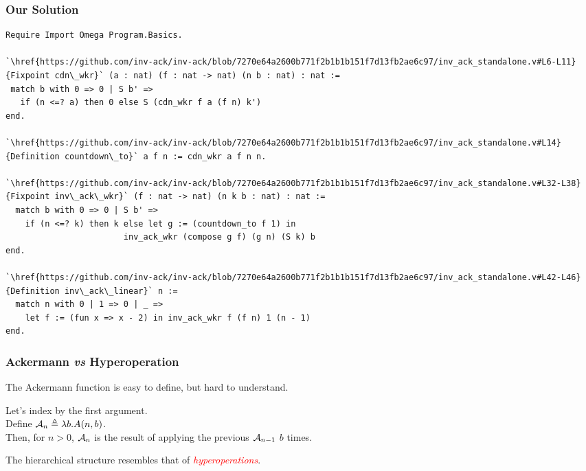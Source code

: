 \begin{frame}[fragile]
\frametitle{Our Solution}

\vspace{-1em}
\lstset{style=myTinyStyle}
\begin{mdframed}[backgroundcolor=lightgray, roundcorner=10pt,leftmargin=0, rightmargin=0, innerleftmargin=0, innertopmargin=-5,innerbottommargin=-5, outerlinewidth=0, linecolor=lightgray]
\begin{lstlisting}
Require Import Omega Program.Basics.

`\href{https://github.com/inv-ack/inv-ack/blob/7270e64a2600b771f2b1b1b151f7d13fb2ae6c97/inv_ack_standalone.v#L6-L11}{Fixpoint cdn\_wkr}` (a : nat) (f : nat -> nat) (n b : nat) : nat :=
 match b with 0 => 0 | S b' =>
   if (n <=? a) then 0 else S (cdn_wkr f a (f n) k')
end.

`\href{https://github.com/inv-ack/inv-ack/blob/7270e64a2600b771f2b1b1b151f7d13fb2ae6c97/inv_ack_standalone.v#L14}{Definition countdown\_to}` a f n := cdn_wkr a f n n.

`\href{https://github.com/inv-ack/inv-ack/blob/7270e64a2600b771f2b1b1b151f7d13fb2ae6c97/inv_ack_standalone.v#L32-L38} {Fixpoint inv\_ack\_wkr}` (f : nat -> nat) (n k b : nat) : nat :=
  match b with 0 => 0 | S b' =>
    if (n <=? k) then k else let g := (countdown_to f 1) in
                        inv_ack_wkr (compose g f) (g n) (S k) b
end.

`\href{https://github.com/inv-ack/inv-ack/blob/7270e64a2600b771f2b1b1b151f7d13fb2ae6c97/inv_ack_standalone.v#L42-L46}{Definition inv\_ack\_linear}` n :=
  match n with 0 | 1 => 0 | _ => 
    let f := (fun x => x - 2) in inv_ack_wkr f (f n) 1 (n - 1)
end.
\end{lstlisting}
\end{mdframed} 
\end{frame}


\begin{frame}
\frametitle{Ackermann \emph{vs} Hyperoperation}

The Ackermann function is easy to define, but hard to
understand.

\bigskip

\pause 	
Let's index by the first argument. \\ \smallskip
Define $\mathcal{A}_n \triangleq \lambda b.A(n,b)$. \\ \smallskip
Then, for $n>0$, $\mathcal{A}_n$ is the result of applying the previous $\mathcal{A}_{n-1}$ $b$ times.


\bigskip

\pause 
The hierarchical structure resembles that of \textcolor{red}{\emph{hyperoperations}}.

\end{frame}


